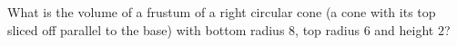 What is the volume of a frustum of a right circular cone (a cone with its top sliced off parallel to the base) with bottom radius $8$, top radius $6$ and height $2$?
